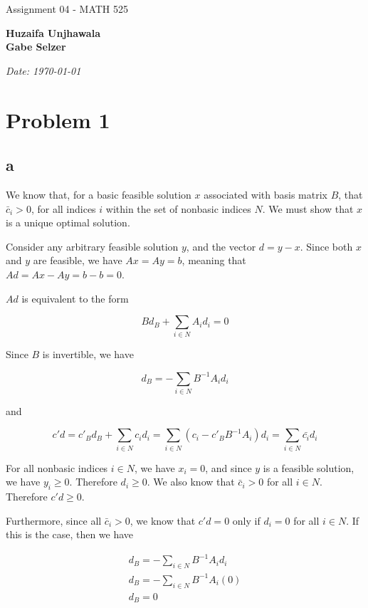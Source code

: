 \documentclass[11pt,a4paper]{article}
\begin{document}
\begin{titlepage}
    \centering
    \vspace*{0.5cm}
    \par\normalfont\fontsize{35}{35}\sffamily\selectfont
    Assignment 04 - MATH 525\par 
    \vspace*{1cm}
    {\huge\bfseries Huzaifa Unjhawala \\  Gabe Selzer \par} 
    \vspace*{1cm}
    {\Large\itshape Date: \today\par} 
    \vfill
\end{titlepage}

\section{Problem 1}
\subsection{a}
We know that, for a basic feasible solution $x$ associated with basis matrix $B$, that $\bar{c}_i>0$, for all indices $i$ within the set of nonbasic indices $N$. We must show that $x$ is a unique optimal solution.

Consider any arbitrary feasible solution $y$, and the vector $d=y-x$. Since both $x$ and $y$ are feasible, we have $Ax=Ay=b$, meaning that $Ad=Ax-Ay=b-b=0$.

$Ad$ is equivalent to the form

$$
Bd_B + \sum_{i\in N} A_id_i=0
$$

Since $B$ is invertible, we have 

$$
d_B = -\sum_{i\in N}B^{-1}A_id_i
$$

and

$$
c'd=c'_Bd_B + \sum_{i\in N}c_id_i=\sum_{i\in N}(c_i-c'_BB^{-1}A_i)d_i=\sum_{i\in N}\bar{c_i}d_i
$$

For all nonbasic indices $i\in N$, we have $x_i=0$, and since $y$ is a feasible solution, we have $y_i\geq 0$. Therefore $d_i\geq 0$. We also know that $\bar{c}_i>0$ for all $i\in N$. Therefore $c'd\geq 0$. 

Furthermore, since all $\bar{c}_i>0$, we know that $c'd=0$ only if $d_i=0$ for all $i\in N$. If this is the case, then we have 

\begin{equation}
\begin{split}
d_B=-\sum_{i\in N} B^{-1}A_id_i \\
d_B=-\sum_{i\in N} B^{-1}A_i(0) \\
d_B=0
\end{split}
\end{equation}
\end{document}
